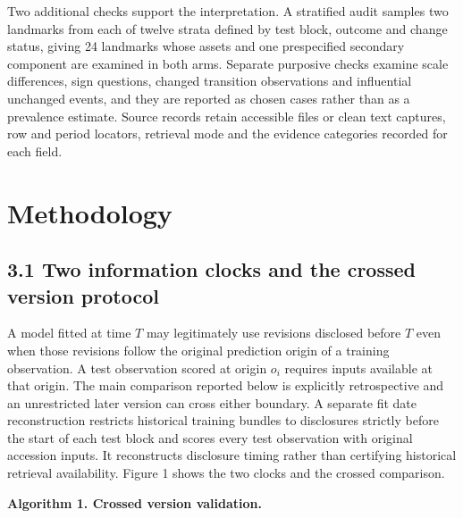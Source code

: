 \documentclass[10pt,a4paper,twocolumn]{article}
\begin{document}
Two additional checks support the interpretation. A stratified audit samples two landmarks from each of twelve strata defined by test block, outcome and change status, giving 24 landmarks whose assets and one prespecified secondary component are examined in both arms. Separate purposive checks examine scale differences, sign questions, changed transition observations and influential unchanged events, and they are reported as chosen cases rather than as a prevalence estimate. Source records retain accessible files or clean text captures, row and period locators, retrieval mode and the evidence categories recorded for each field.
\section{Methodology}
\subsection{3.1 Two information clocks and the crossed version protocol}

A model fitted at time $T$ may legitimately use revisions disclosed before $T$ even when those revisions follow the original prediction origin of a training observation. A test observation scored at origin $o_i$ requires inputs available at that origin. The main comparison reported below is explicitly retrospective and an unrestricted later version can cross either boundary. A separate fit date reconstruction restricts historical training bundles to disclosures strictly before the start of each test block and scores every test observation with original accession inputs. It reconstructs disclosure timing rather than certifying historical retrieval availability. Figure 1 shows the two clocks and the crossed comparison.

\par\vspace{4pt}\par\vspace{4pt}

\textbf{Algorithm 1. Crossed version validation.}
\end{document}
